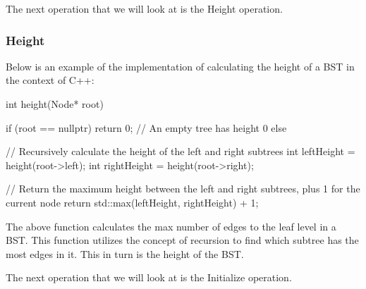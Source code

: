 The next operation that we will look at is the Height operation.

\begin{highlight}

\subsubsection*{Height}

Below is an example of the implementation of calculating the height of a BST in the context of C++:

\begin{code}
int height(Node* root) {
    if (root == nullptr) {
        return 0;  // An empty tree has height 0
    }
    else {
        // Recursively calculate the height of the left and right subtrees
        int leftHeight = height(root->left);
        int rightHeight = height(root->right);

        // Return the maximum height between the left and right subtrees, plus 1 for the current node
        return std::max(leftHeight, rightHeight) + 1;
    }
}    
\end{code}

\noindent The above function calculates the max number of edges to the leaf level in a BST. This function utilizes the concept of recursion to find which subtree has the most edges in it. This in turn is the
height of the BST.

\end{highlight}

The next operation that we will look at is the Initialize operation.

